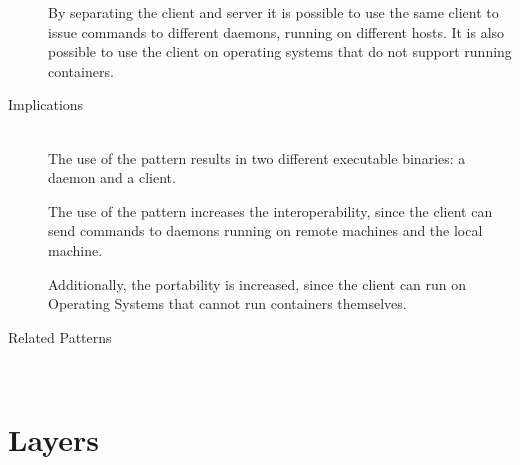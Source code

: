 \begin{description}

By separating the client and server it is possible to use the same client to issue commands to different daemons, running on different hosts.
It is also possible to use the client on operating systems that do not support running containers.

\item [Implications]~\\
The use of the  pattern results in two different executable binaries: a daemon and a client. 

The use of the  pattern increases the interoperability, since the client can send commands to daemons running on remote machines and the local machine.

Additionally, the portability is increased, since the client can run on Operating Systems that cannot run containers themselves.


\item [Related Patterns]~\\


\end{description}

\clearpage
\section{Layers}


